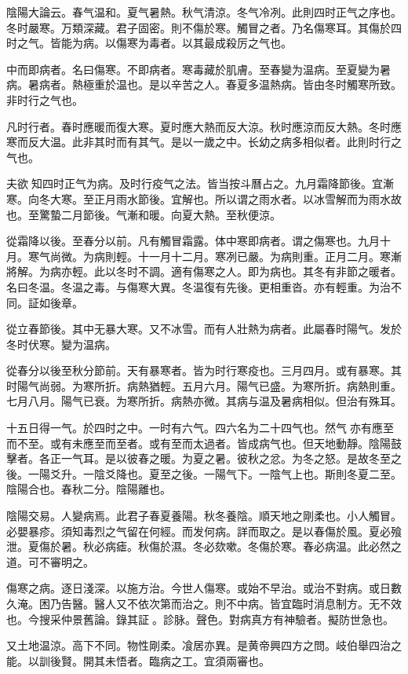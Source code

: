 陰陽大論云。春气温和。夏气暑熱。秋气清涼。冬气冷冽。此則四时正气之序也。冬时嚴寒。万類深藏。君子固密。則不傷於寒。觸冒之者。乃名傷寒耳。其傷於四时之气。皆能为病。以傷寒为毒者。以其最成殺厉之气也。

中而即病者。名曰傷寒。不即病者。寒毒藏於肌膚。至春變为温病。至夏變为暑病。暑病者。熱極重於温也。是以辛苦之人。春夏多温熱病。皆由冬时觸寒所致。非时行之气也。

凡时行者。春时應暖而復大寒。夏时應大熱而反大涼。秋时應涼而反大熱。冬时應寒而反大温。此非其时而有其气。是以一歲之中。长幼之病多相似者。此則时行之气也。

夫欲{\sungtpii 𠊱}知四时正气为病。及时行疫气之法。皆当按斗曆占之。九月霜降節後。宜漸寒。向冬大寒。至正月雨水節後。宜解也。所以谓之雨水者。以冰雪解而为雨水故也。至驚蟄二月節後。气漸和暖。向夏大熱。至秋便涼。

從霜降以後。至春分以前。凡有觸冒霜露。体中寒即病者。谓之傷寒也。九月十月。寒气尚微。为病則輕。十一月十二月。寒冽已嚴。为病則重。正月二月。寒漸將解。为病亦輕。此以冬时不調。適有傷寒之人。即为病也。其冬有非節之暖者。名曰冬温。冬温之毒。与傷寒大異。冬温復有先後。更相重沓。亦有輕重。为治不同。証如後章。

從立春節後。其中无暴大寒。又不冰雪。而有人壯熱为病者。此屬春时陽气。发於冬时伏寒。變为温病。

從春分以後至秋分節前。天有暴寒者。皆为时行寒疫也。三月四月。或有暴寒。其时陽气尚弱。为寒所折。病熱猶輕。五月六月。陽气已盛。为寒所折。病熱則重。七月八月。陽气已衰。为寒所折。病熱亦微。其病与温及暑病相似。但治有殊耳。

十五日得一气。於四时之中。一时有六气。四六名为二十四气也。然气{\sungtpii 𠊱}亦有應至而不至。或有未應至而至者。或有至而太過者。皆成病气也。但天地動靜。陰陽鼓擊者。各正一气耳。是以彼春之暖。为夏之暑。彼秋之忿。为冬之怒。是故冬至之後。一陽爻升。一陰爻降也。夏至之後。一陽气下。一陰气上也。斯則冬夏二至。陰陽合也。春秋二分。陰陽離也。

陰陽交易。人變病焉。此君子春夏養陽。秋冬養陰。順天地之剛柔也。小人觸冒。必嬰暴疹。須知毒烈之气留在何經。而发何病。詳而取之。是以春傷於風。夏必飱泄。夏傷於暑。秋必病瘧。秋傷於濕。冬必欬嗽。冬傷於寒。春必病温。此必然之道。可不審明之。

傷寒之病。逐日淺深。以施方治。今世人傷寒。或始不早治。或治不對病。或日數久淹。困乃告醫。醫人又不依次第而治之。則不中病。皆宜臨时消息制方。无不效也。今搜采仲景舊論。錄其証{\sungtpii 𠊱}。診脉。聲色。對病真方有神驗者。擬防世急也。

又土地温涼。高下不同。物性剛柔。飡居亦異。是黄帝興四方之問。岐伯舉四治之能。以訓後賢。開其未悟者。臨病之工。宜須兩審也。

